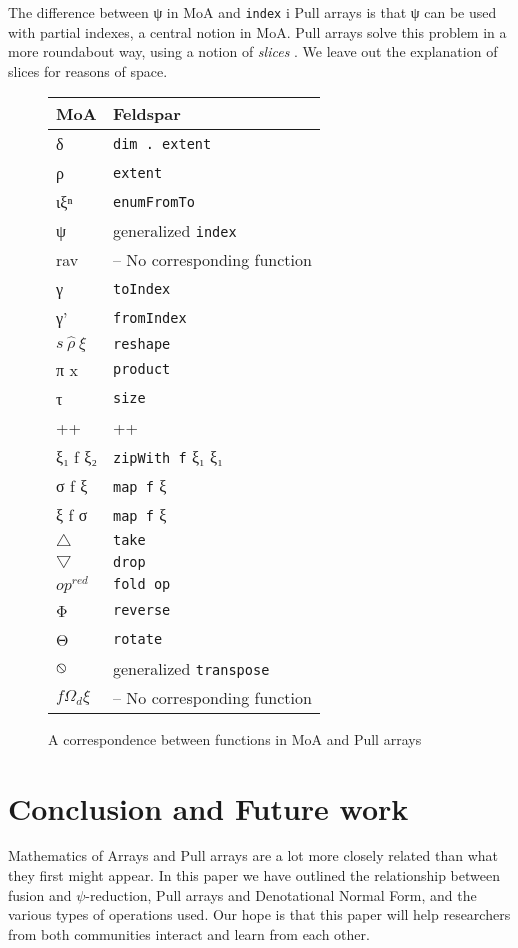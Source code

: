 \documentclass[preprint]{sigplanconf}
\begin{document}
The difference between ψ in MoA and \verb!index! i Pull arrays is that
ψ can be used with partial indexes, a central notion in MoA. Pull
arrays solve this problem in a more roundabout way, using a notion of
\emph{slices} \cite{keller2010regular}. We leave out the explanation
of slices for reasons of space.

\begin{figure}
\begin{center}
\begin{tabular}{|@{}l|l@{}|}
\hline
MoA & Feldspar
\\
\hline
δ & \verb!dim . extent!
\\
ρ & \verb!extent!
\\
ιξⁿ & \verb!enumFromTo!
\\
ψ & generalized \verb!index!
\\
rav & -- No corresponding function
\\
γ & \verb!toIndex!
\\
γ' & \verb!fromIndex!
\\
$s \: \hat{ρ} \: ξ$ & \verb!reshape!
\\
π x & \verb!product!
\\
τ & \verb!size!
\\
++ & ++
\\
ξ₁ f ξ₂ & \verb!zipWith f! ξ₁ ξ₁
\\
σ f ξ & \verb!map f! ξ
\\
ξ f σ & \verb!map f! ξ
\\
$\bigtriangleup$ & \verb!take!
\\
$\bigtriangledown$ & \verb!drop!
\\
$op^{red}$ & \verb!fold op!
\\
Φ & \verb!reverse!
\\
Θ & \verb!rotate!
\\
$\varobslash$ & generalized \verb!transpose!
\\
$f Ω_d ξ$ & -- No corresponding function
\\
\hline
\end{tabular}
\end{center}
\caption{A correspondence between functions in MoA and Pull arrays}
\label{fig:rosetta}
\end{figure}

\section{Conclusion and Future work}

Mathematics of Arrays and Pull arrays are a lot more closely related
than what they first might appear. In this paper we have outlined the
relationship between fusion and \(\psi\)-reduction, Pull arrays and
Denotational Normal Form, and the various types of operations used.
Our hope is that this paper will help researchers from both
communities interact and learn from each other.
\end{document}
